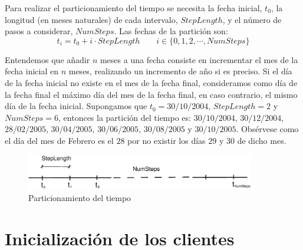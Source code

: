 Para realizar el particionamiento del tiempo se necesita la fecha inicial, $t_0$,
la longitud (en meses naturales) de cada intervalo, $StepLength$, y el n\'umero
de pasos a considerar, $NumSteps$. Las fechas de la partici\'on son:
\begin{displaymath}
t_i = t_0 + i \cdot StepLength \qquad i \in \{0, 1, 2, \cdots, NumSteps\}
\end{displaymath}

Entendemos que a\~nadir $n$ meses a una fecha consiste en incrementar el
mes de la fecha inicial en $n$ meses, realizando un incremento de a\~no si
es preciso. Si el d\'ia de la fecha inicial no existe en el mes de la fecha
final, consideramos como d\'ia de la fecha final el m\'aximo d\'ia del mes
de la fecha final, en caso contrario, el mismo d\'ia de la fecha inicial.
\newline
\newline
Supongamos que $t_0=30/10/2004$, $StepLength=2$ y $NumSteps=6$, entonces la
partici\'on del tiempo es: $30/10/2004$, $30/12/2004$, $28/02/2005$, $30/04/2005$,
$30/06/2005$, $30/08/2005$ y $30/10/2005$. Obs\'ervese como el d\'ia del mes de
Febrero es el $28$ por no existir los d\'ias $29$ y $30$ de dicho mes.

\begin{figure}[!hb]
\begin{center}
\includegraphics[width=10cm,angle=0]{./images/time.eps}
\caption{Particionamiento del tiempo}
\label{timetranches}
\end{center}
\end{figure}


\section{Inicializaci\'on de los clientes}

